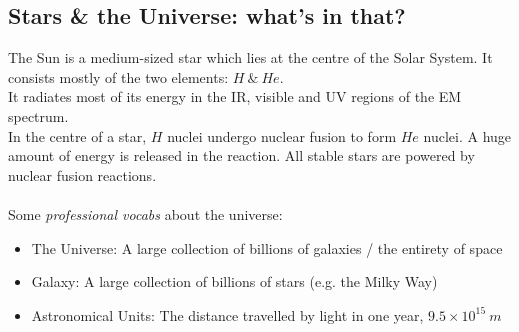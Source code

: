 \documentclass[a4paper,12pt]{article}
\begin{document}
\subsection{Stars \& the Universe: what's in that?}
The Sun is a medium-sized star which lies at the centre of the Solar System. It consists mostly of the two elements: \(H\ \&\ He\).\\
It radiates most of its energy in the IR, visible and UV regions of the EM spectrum.\\
In the centre of a star, \(H\) nuclei undergo nuclear fusion to form \(He\) nuclei. A huge amount of energy is released in the reaction. 
All stable stars are powered by nuclear fusion reactions. \\\\
Some \textit{professional vocabs} about the universe:
\begin{itemize}
    \item The Universe: A large collection of billions of galaxies / the entirety of space
    \item Galaxy: A large collection of billions of stars (e.g. the Milky Way)
    \item Astronomical Units: The distance travelled by light in one year, \(9.5\times 10^{15}\ m\)
\end{itemize}
\newpage
\end{document}
